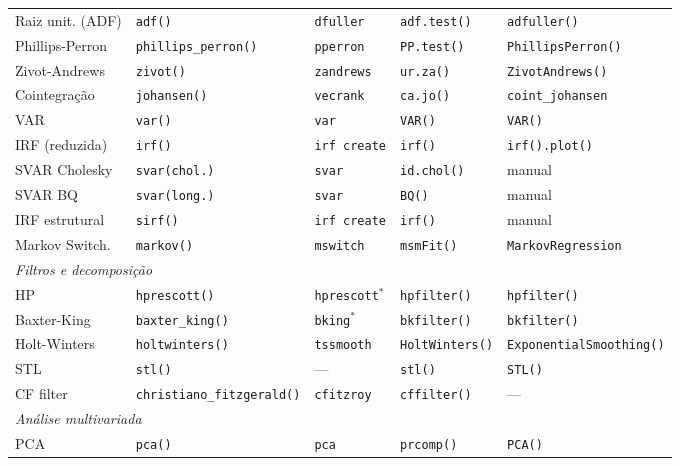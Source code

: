{\begin{longtable}{lllll}
Raiz unit. (ADF) & \texttt{adf()}       & \texttt{dfuller}      & \texttt{adf.test()}    & \texttt{adfuller()} \\
Phillips-Perron & \texttt{phillips\_perron()} & \texttt{pperron} & \texttt{PP.test()}   & \texttt{PhillipsPerron()} \\
Zivot-Andrews   & \texttt{zivot()}      & \texttt{zandrews}     & \texttt{ur.za()}       & \texttt{ZivotAndrews()} \\
Cointegração    & \texttt{johansen()}   & \texttt{vecrank}      & \texttt{ca.jo()}       & \texttt{coint\_johansen} \\
VAR             & \texttt{var()}        & \texttt{var}          & \texttt{VAR()}         & \texttt{VAR()} \\
IRF (reduzida)  & \texttt{irf()}        & \texttt{irf create}   & \texttt{irf()}         & \texttt{irf().plot()} \\
SVAR Cholesky   & \texttt{svar(chol.)}  & \texttt{svar}         & \texttt{id.chol()}     & manual \\
SVAR BQ         & \texttt{svar(long.)}  & \texttt{svar}         & \texttt{BQ()}          & manual \\
IRF estrutural  & \texttt{sirf()}       & \texttt{irf create}   & \texttt{irf()}         & manual \\
Markov Switch.  & \texttt{markov()}     & \texttt{mswitch}      & \texttt{msmFit()}      & \texttt{MarkovRegression} \\
\midrule
\multicolumn{5}{l}{\textit{Filtros e decomposição}} \\
HP              & \texttt{hprescott()}  & \texttt{hprescott}$^*$ & \texttt{hpfilter()}  & \texttt{hpfilter()} \\
Baxter-King     & \texttt{baxter\_king()} & \texttt{bking}$^*$  & \texttt{bkfilter()}   & \texttt{bkfilter()} \\
Holt-Winters    & \texttt{holtwinters()} & \texttt{tssmooth}   & \texttt{HoltWinters()} & \texttt{ExponentialSmoothing()} \\
STL             & \texttt{stl()}        & —                     & \texttt{stl()}         & \texttt{STL()} \\
CF filter       & \texttt{christiano\_fitzgerald()} & \texttt{cfitzroy} & \texttt{cffilter()} & — \\
\midrule
\multicolumn{5}{l}{\textit{Análise multivariada}} \\
PCA             & \texttt{pca()}        & \texttt{pca}          & \texttt{prcomp()}      & \texttt{PCA()} \\

\end{longtable}}
